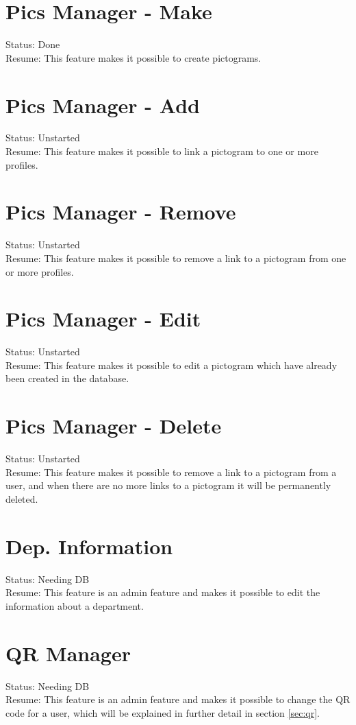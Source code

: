 \section{Pics Manager - Make}
Status: Done\\
Resume: This feature makes it possible to create pictograms.

\section{Pics Manager - Add}
Status: Unstarted\\
Resume: This feature makes it possible to link a pictogram to one or more profiles.

\section{Pics Manager - Remove}
Status: Unstarted\\
Resume: This feature makes it possible to remove a link to a pictogram from one or more profiles.

\section{Pics Manager - Edit}
Status: Unstarted\\
Resume: This feature makes it possible to edit a pictogram which have already been created in the database.

\section{Pics Manager - Delete}
Status: Unstarted\\
Resume: This feature makes it possible to remove a link to a pictogram from a user, and when there are no more links to a pictogram it will be permanently deleted. 

\section{Dep. Information}
Status: Needing DB\\
Resume: This feature is an admin feature and makes it possible to edit the information about a department.

\section{QR Manager}
Status: Needing DB\\
Resume: This feature is an admin feature and makes it possible to change the QR code for a user, which will be explained in further detail in section \vref{sec:qr}.

